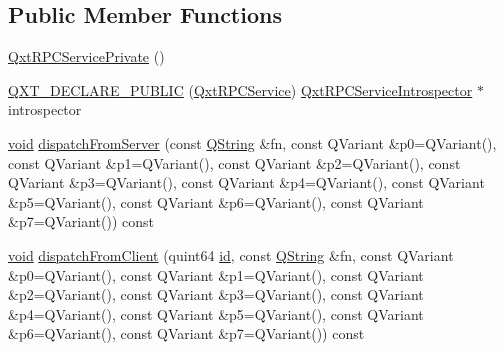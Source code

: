 \subsection*{Public Member Functions}
\begin{DoxyCompactItemize}
\item 
\hyperlink{class_qxt_r_p_c_service_private_abeb052110f955f7c8e5968138f233fbe}{Qxt\-R\-P\-C\-Service\-Private} ()
\item 
\hyperlink{class_qxt_r_p_c_service_private_aa8f51c885bca5b8d79d46264a71b4a7b}{Q\-X\-T\-\_\-\-D\-E\-C\-L\-A\-R\-E\-\_\-\-P\-U\-B\-L\-I\-C} (\hyperlink{class_qxt_r_p_c_service}{Qxt\-R\-P\-C\-Service}) \hyperlink{class_qxt_r_p_c_service_introspector}{Qxt\-R\-P\-C\-Service\-Introspector} $\ast$introspector
\item 
\hyperlink{group___u_a_v_objects_plugin_ga444cf2ff3f0ecbe028adce838d373f5c}{void} \hyperlink{class_qxt_r_p_c_service_private_a8b8231796a35f820dae91d92cae9b5fa}{dispatch\-From\-Server} (const \hyperlink{group___u_a_v_objects_plugin_gab9d252f49c333c94a72f97ce3105a32d}{Q\-String} \&fn, const Q\-Variant \&p0=Q\-Variant(), const Q\-Variant \&p1=Q\-Variant(), const Q\-Variant \&p2=Q\-Variant(), const Q\-Variant \&p3=Q\-Variant(), const Q\-Variant \&p4=Q\-Variant(), const Q\-Variant \&p5=Q\-Variant(), const Q\-Variant \&p6=Q\-Variant(), const Q\-Variant \&p7=Q\-Variant()) const 
\item 
\hyperlink{group___u_a_v_objects_plugin_ga444cf2ff3f0ecbe028adce838d373f5c}{void} \hyperlink{class_qxt_r_p_c_service_private_abc395a37f8c6932b55d1691f795f98f1}{dispatch\-From\-Client} (quint64 \hyperlink{glext_8h_a58c2a664503e14ffb8f21012aabff3e9}{id}, const \hyperlink{group___u_a_v_objects_plugin_gab9d252f49c333c94a72f97ce3105a32d}{Q\-String} \&fn, const Q\-Variant \&p0=Q\-Variant(), const Q\-Variant \&p1=Q\-Variant(), const Q\-Variant \&p2=Q\-Variant(), const Q\-Variant \&p3=Q\-Variant(), const Q\-Variant \&p4=Q\-Variant(), const Q\-Variant \&p5=Q\-Variant(), const Q\-Variant \&p6=Q\-Variant(), const Q\-Variant \&p7=Q\-Variant()) const 
\end{DoxyCompactItemize}
